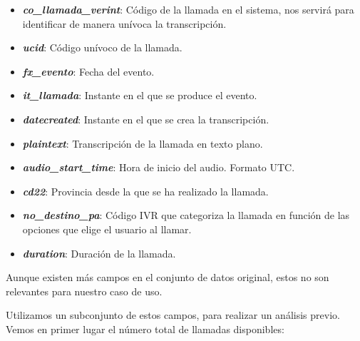  \begin{itemize}


\item \textbf{\textit{co\_llamada\_verint}}: Código de la llamada en el sistema, nos servirá
para identificar de manera unívoca la transcripción.

 \item \textbf{\textit{ucid}}: Código unívoco de la llamada.

\item \textbf{\textit{fx\_evento}}: Fecha del evento.

\item \textbf{\textit{it\_llamada}}: Instante en el que se produce el evento.

\item \textbf{\textit{datecreated}}: Instante en el que se crea la transcripción.

\item \textbf{\textit{plaintext}}: Transcripción de la llamada en texto plano.

\item \textbf{\textit{audio\_start\_time}}: Hora de inicio del audio. Formato UTC.

\item \textbf{\textit{cd22}}: Provincia desde la que se ha realizado la llamada. 

\item \textbf{\textit{no\_destino\_pa}}: Código IVR que categoriza la llamada en función de las
opciones que elige el usuario al llamar.

\item \textbf{\textit{duration}}: Duración de la llamada.


 \end{itemize}

Aunque existen más campos en el conjunto de datos original, estos no son relevantes para 
nuestro caso de uso.

    Utilizamos  un subconjunto de estos campos, para realizar un análisis
previo. Vemos en primer lugar el número total de llamadas disponibles:
\vspace{0.5cm}

